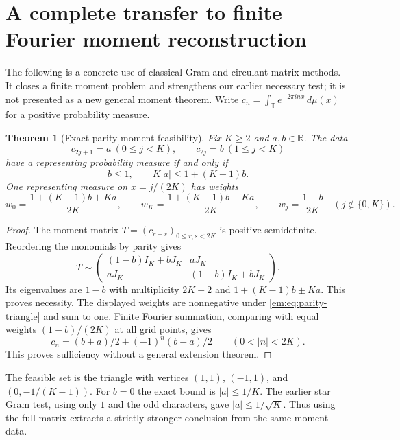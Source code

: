 \documentclass[11pt,a4paper]{article}
\newtheorem{theorem}{Theorem}[section]
\theoremstyle{definition}
\theoremstyle{remark}
\theoremstyle{plain}
\numberwithin{equation}{section}
\begin{document}
\section{A complete transfer to finite Fourier moment reconstruction}
\label{em:sec:transfer-moments}

The following is a concrete use of classical Gram and circulant matrix
methods. It closes a finite moment problem and strengthens our earlier
necessary test; it is not presented as a new general moment theorem.
Write $c_n=\int_{\mathbb T}e^{-2\pi i n x}\,d\mu(x)$ for a positive
probability measure.

\begin{theorem}[Exact parity-moment feasibility]\label{em:thm:parity-moment}
Fix $K\ge2$ and $a,b\in\mathbb R$. The data
\[
c_{2j+1}=a\ (0\le j<K),\qquad c_{2j}=b\ (1\le j<K)
\]
have a representing probability measure if and only if
\begin{equation}\label{em:eq:parity-triangle}
b\le1,\qquad K|a|\le1+(K-1)b.
\end{equation}
One representing measure on $x=j/(2K)$ has weights
\[
w_0=\frac{1+(K-1)b+Ka}{2K},\qquad
w_K=\frac{1+(K-1)b-Ka}{2K},\qquad
w_j=\frac{1-b}{2K}\quad(j\notin\{0,K\}).
\]
\end{theorem}
\begin{proof}
The moment matrix $T=(c_{r-s})_{0\le r,s<2K}$ is positive semidefinite.
Reordering the monomials by parity gives
\[
T\sim\begin{pmatrix}
(1-b)I_K+bJ_K&aJ_K\\
aJ_K&(1-b)I_K+bJ_K
\end{pmatrix}.
\]
Its eigenvalues are $1-b$ with multiplicity $2K-2$ and
$1+(K-1)b\pm Ka$. This proves necessity. The displayed weights are
nonnegative under \eqref{em:eq:parity-triangle} and sum to one.
Finite Fourier summation, comparing with equal weights
$(1-b)/(2K)$ at all grid points, gives
\[
c_n=(b+a)/2+(-1)^n(b-a)/2\qquad(0<|n|<2K).
\]
This proves sufficiency without a general extension theorem.
\end{proof}

The feasible set is the triangle with vertices $(1,1)$, $(-1,1)$,
and $(0,-1/(K-1))$. For $b=0$ the exact bound is $|a|\le1/K$.
The earlier star Gram test, using only $1$ and the odd characters,
gave $|a|\le1/\sqrt K$. Thus using the full matrix extracts a
strictly stronger conclusion from the same moment data.
\end{document}
